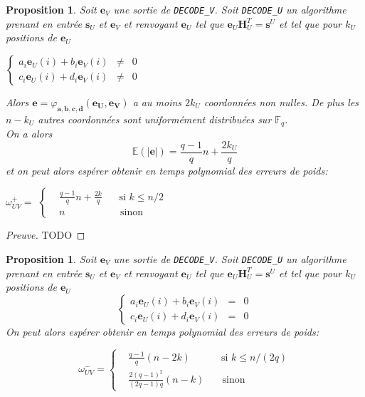 \documentclass[12pt]{article}
\theoremstyle{plain}
\newtheorem{propo}[thm]{Proposition}
\newcommand{\F}{\mathbb{F}}
\begin{document}
\begin{propo} Soit $\mathbf{e}_V$ une sortie de \verb|DECODE_V|. Soit \verb|DECODE_U| un algorithme prenant en entrée $\mathbf{s}_U$ et $\mathbf{e}_V$ et renvoyant $\mathbf{e}_U$ tel que $\mathbf{e}_U\mathbf{H}_U^T = \mathbf{s}^U$ et tel que pour $k_U$ positions de $\mathbf{e}_U$ 
\begin{center}
$\left \{
\begin{array}{rcl}
a_i\mathbf{e}_U(i) + b_i\mathbf{e}_V(i) &\neq& 0 \\
c_i\mathbf{e}_U(i) + d_i\mathbf{e}_V(i) &\neq& 0
\end{array}
\right.$
\end{center}
Alors $\mathbf{e} = \varphi_{\mathbf{a},\mathbf{b},\mathbf{c},\mathbf{d}}(\mathbf{e_U},\mathbf{e_V})$ a au moins $2k_U$ coordonnées non nulles. De plus les $n-k_U$ autres coordonnées sont uniformément distribuées sur $\F_q$. \\
On a alors 
$$ \mathbb{E}(|\mathbf{e}|) = \frac{q-1}{q}n + \frac{2k_U}{q} $$
et on peut alors espérer obtenir en temps polynomial des erreurs de poids:
\begin{center}
$\omega^+_{UV} = $
$\left \{
\begin{array}{rcl}
&\frac{q-1}{q}n + \frac{2k}{q} & \;\; \text{ si } k \leq n/2 \\
&n & \quad \text{sinon}
\end{array}
\right.$
\end{center}
\end{propo}

\begin{proof}[Preuve]
TODO
\end{proof}


\begin{propo} Soit $\mathbf{e}_V$ une sortie de \verb|DECODE_V|. Soit \verb|DECODE_U| un algorithme prenant en entrée $\mathbf{s}_U$ et $\mathbf{e}_V$ et renvoyant $\mathbf{e}_U$ tel que $\mathbf{e}_U\mathbf{H}_U^T = \mathbf{s}^U$ et tel que pour $k_U$ positions de $\mathbf{e}_U$ 
\begin{equation}\label{syst petit poid}
\left \{
\begin{array}{rcl}
a_i\mathbf{e}_U(i) + b_i\mathbf{e}_V(i) &=& 0 \\
c_i\mathbf{e}_U(i) + d_i\mathbf{e}_V(i) &=& 0
\end{array}
\right.
\end{equation}
On peut alors espérer obtenir en temps polynomial des erreurs de poids:
\begin{center}
\begin{equation} 
\omega^-_{UV} = 
\left \{
\begin{array}{rcl}
&\frac{q-1}{q}(n-2k) & \;\; \text{ si } k \leq n/(2q) \\
&\frac{2(q-1)^2}{(2q-1)q}(n-k) & \quad \text{sinon}
\end{array}
\right.
\end{equation}
\end{center}
\end{propo}
\end{document}
